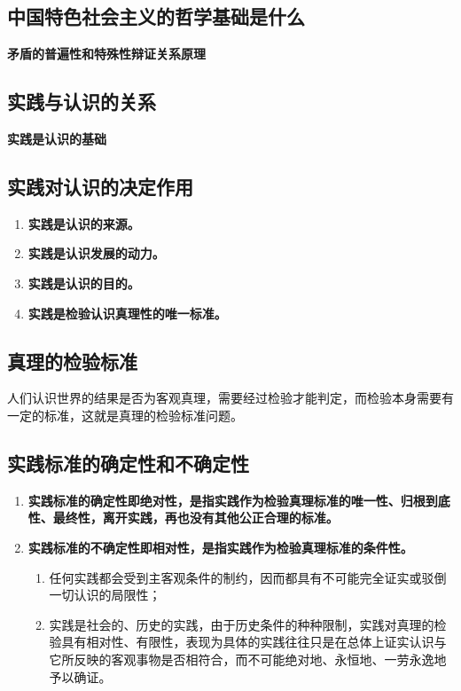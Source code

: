 \documentclass[12pt, a4paper, oneside]{ctexbook}
\begin{document}
\subsection{中国特色社会主义的哲学基础是什么}

\textbf{矛盾的普遍性和特殊性辩证关系原理}

\subsection{实践与认识的关系}

\textbf{实践是认识的基础}

\subsection{实践对认识的决定作用}

\begin{enumerate}
\item \textbf{实践是认识的来源。}
\item \textbf{实践是认识发展的动力。}
\item \textbf{实践是认识的目的。}
\item \textbf{实践是检验认识真理性的唯一标准。}
\end{enumerate}

\subsection{真理的检验标准}

人们认识世界的结果是否为客观真理，需要经过检验才能判定，而检验本身需要有一定的标准，这就是真理的检验标准问题。

\subsection{实践标准的确定性和不确定性}

\begin{enumerate}
\item \textbf{实践标准的确定性即绝对性，是指实践作为检验真理标准的唯一性、归根到底性、最终性，离开实践，再也没有其他公正合理的标准。}
\item \textbf{实践标准的不确定性即相对性，是指实践作为检验真理标准的条件性。}
\begin{enumerate}
\item 任何实践都会受到主客观条件的制约，因而都具有不可能完全证实或驳倒一切认识的局限性；
\item 实践是社会的、历史的实践，由于历史条件的种种限制，实践对真理的检验具有相对性、有限性，表现为具体的实践往往只是在总体上证实认识与它所反映的客观事物是否相符合，而不可能绝对地、永恒地、一劳永逸地予以确证。
\end{enumerate}
\end{enumerate}
\end{document}
